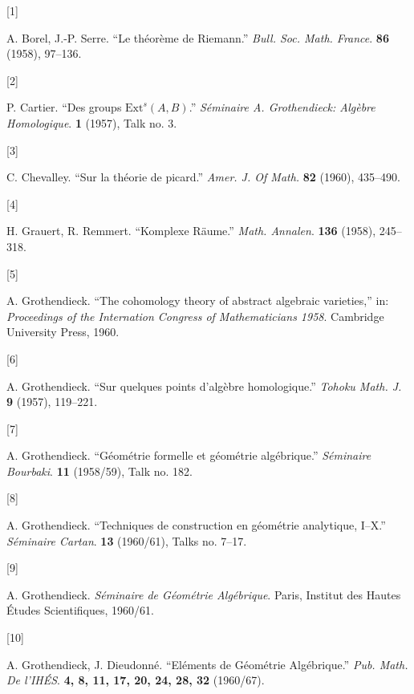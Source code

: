 \documentclass{article}
\newlength{\cslhangindent}
\newlength{\csllabelwidth}
\newenvironment{CSLReferences}[2] %
 {%
  \setlength{\parindent}{0pt}
  \ifodd #1 \everypar{\setlength{\hangindent}{\cslhangindent}}\ignorespaces\fi
  \setlength{\parskip}{0.75\baselineskip}
 }%
 {}
\newcommand{\CSLLeftMargin}[1]{\parbox[t]{\maxof{\widthof{#1}}{\csllabelwidth}}{#1}}
\newcommand{\CSLRightInline}[1]{\parbox[t]{\linewidth}{#1}}
\theoremstyle{definition}
\theoremstyle{definition}
\theoremstyle{definition}
\theoremstyle{definition}
\theoremstyle{remark}
\begin{document}
\hypertarget{refs}{}
\begin{CSLReferences}{0}{0}
\leavevmode{}%
\CSLLeftMargin{{[}1{]} }%
\CSLRightInline{A. Borel, J.-P. Serre. {``Le théorème de {Riemann}\textendash{{Roch}}.''} \emph{Bull. Soc. Math. France}. \textbf{86} (1958), 97--136.}

\leavevmode{}%
\CSLLeftMargin{{[}2{]} }%
\CSLRightInline{P. Cartier. {``Des groups \(\mathrm{Ext}^s(A,B)\).''} \emph{Séminaire A. Grothendieck: Algèbre Homologique}. \textbf{1} (1957), Talk no. 3.}

\leavevmode{}%
\CSLLeftMargin{{[}3{]} }%
\CSLRightInline{C. Chevalley. {``Sur la théorie de picard.''} \emph{Amer. J. Of Math.} \textbf{82} (1960), 435--490.}

\leavevmode{}%
\CSLLeftMargin{{[}4{]} }%
\CSLRightInline{H. Grauert, R. Remmert. {``{Komplexe Räume}.''} \emph{Math. Annalen}. \textbf{136} (1958), 245--318.}

\leavevmode{}%
\CSLLeftMargin{{[}5{]} }%
\CSLRightInline{A. Grothendieck. {``The cohomology theory of abstract algebraic varieties,''} in: \emph{Proceedings of the {Internation Congress} of {Mathematicians} 1958}. {Cambridge University Press}, 1960.}

\leavevmode{}%
\CSLLeftMargin{{[}6{]} }%
\CSLRightInline{A. Grothendieck. {``Sur quelques points d'algèbre homologique.''} \emph{Tohoku Math. J.} \textbf{9} (1957), 119--221.}

\leavevmode{}%
\CSLLeftMargin{{[}7{]} }%
\CSLRightInline{A. Grothendieck. {``Géométrie formelle et géométrie algébrique.''} \emph{Séminaire Bourbaki}. \textbf{11} (1958/59), Talk no. 182.}

\leavevmode{}%
\CSLLeftMargin{{[}8{]} }%
\CSLRightInline{A. Grothendieck. {``Techniques de construction en géométrie analytique, {I}--{X}.''} \emph{Séminaire Cartan}. \textbf{13} (1960/61), Talks no. 7--17.}

\leavevmode{}%
\CSLLeftMargin{{[}9{]} }%
\CSLRightInline{A. Grothendieck. \emph{{Séminaire de Géométrie Algébrique}}. {Paris, Institut des Hautes Études Scientifiques}, 1960/61.}

\leavevmode{}%
\CSLLeftMargin{{[}10{]} }%
\CSLRightInline{A. Grothendieck, J. Dieudonné. {``{Eléments de Géométrie Algébrique}.''} \emph{Pub. Math. De l'IHÉS}. \textbf{4, 8, 11, 17, 20, 24, 28, 32} (1960/67).}


\end{CSLReferences}
\end{document}

